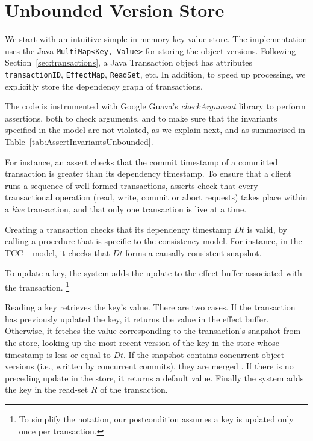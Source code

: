 \documentclass[systeme,french,english]{compas2022}
\newcommand{\commentaire}[2][fromWhom?]{%
  {%
    \color{magenta}{\bfseries\sffamily\scriptsize$\triangleright$(#1:) #2$\triangleleft$}%
  }}
\begin{document}
\section{Unbounded Version Store}


We start with an intuitive simple in-memory key-value store.
The implementation uses the Java \texttt{MultiMap<Key, Value>} for
storing the object versions.
Following Section~\ref{sec:transactions}, a Java Transaction object has
attributes \texttt{transactionID}, \texttt{EffectMap}, \texttt{ReadSet},
etc. 
In addition, to speed up processing, we explicitly store the
dependency graph of transactions.

The code is instrumented with Google Guava's \emph{checkArgument} library\cite{guava}
to perform assertions, both to check
arguments, and to make sure that the invariants specified in the model
are not violated, as we explain next, and as summarised in
Table~\ref{tab:AssertInvariantsUnbounded}.

For instance, an assert checks that the commit timestamp of a committed
transaction is greater than its dependency timestamp.
To ensure that a client runs a sequence of well-formed transactions,
asserts check that every transactional operation (read, write, commit or
abort requests) takes place within a \emph{live} transaction, and that
only one transaction is live at a time.

Creating a transaction checks that its dependency timestamp $Dt$ is
valid, by calling a procedure that is specific to the consistency model.
For instance, in the TCC+ model, it checks that $Dt$ forms a
causally-consistent snapshot.

To update a key, the system adds the update to the effect buffer
associated with the transaction.%
%
\footnote{
%
  To simplify the notation, our postcondition assumes a key is updated
  only once per transaction.
}
%

Reading a key retrieves the key's value.
There are two cases.
If the transaction has previously updated the key, it returns the value
in the effect buffer.
Otherwise, it fetches the value corresponding to the transaction's
snapshot from the store, looking up the most recent version of the key
in the store whose timestamp is less or equal to $\mathit{Dt}$.
If the snapshot contains concurrent object-versions (i.e., written by
concurrent commits), they are merged \cite{syn:rep:sh143}.
If there is no preceding update in the store, it returns a default
value.
Finally the system adds the key in the read-set $R$ of the transaction. 
\end{document}
